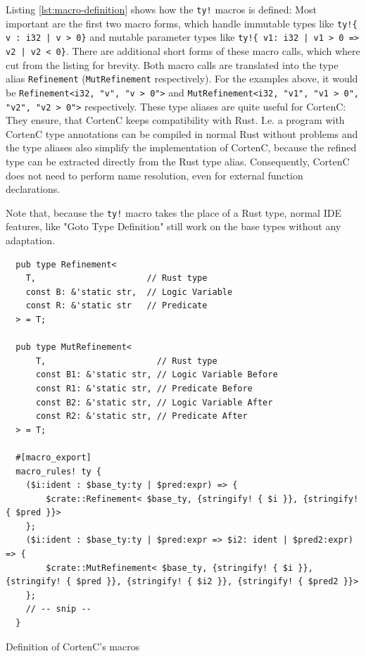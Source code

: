 \documentclass{book}
\newcommand{\code}[1]{\texttt{#1}}
\theoremstyle{definition}
\begin{document}
Listing \ref{lst:macro-definition} shows how the \code{ty!} macros is defined: Most important are the first two macro forms, which handle immutable types like \code{ty!\{ v : i32 | v > 0\}} and mutable parameter types like \code{ty!\{ v1: i32 | v1 > 0 => v2 | v2 < 0\}}. 
There are additional short forms of these macro calls, which where cut from the listing for brevity. Both macro calls are translated into the type alias \code{Refinement} (\code{MutRefinement} respectively). For the examples above, it would be \code{Refinement<i32, "v", "v > 0">} and \code{MutRefinement<i32, "v1", "v1 > 0", "v2", "v2 > 0">} respectively. These type aliases are quite useful for CortenC: They ensure, that CortenC keeps compatibility with Rust. I.e. a program with CortenC type annotations can be compiled in normal Rust without problems and the type aliases also simplify the implementation of CortenC, because the refined type can be extracted directly from the Rust type alias. Consequently, CortenC does not need to perform name resolution, even for external function declarations.

Note that, because the \code{ty!} macro takes the place of a Rust type, normal IDE features, like "Goto Type Definition" still work on the base types without any adaptation.

\begin{listing}[h]
  \begin{verbatim}
  pub type Refinement<
    T,                      // Rust type
    const B: &'static str,  // Logic Variable
    const R: &'static str   // Predicate
  > = T;

  pub type MutRefinement<
      T,                      // Rust type
      const B1: &'static str, // Logic Variable Before
      const R1: &'static str, // Predicate Before
      const B2: &'static str, // Logic Variable After
      const R2: &'static str, // Predicate After
  > = T;

  #[macro_export]
  macro_rules! ty {
    ($i:ident : $base_ty:ty | $pred:expr) => {
        $crate::Refinement< $base_ty, {stringify! { $i }}, {stringify! { $pred }}>
    };
    ($i:ident : $base_ty:ty | $pred:expr => $i2: ident | $pred2:expr) => {
        $crate::MutRefinement< $base_ty, {stringify! { $i }}, {stringify! { $pred }}, {stringify! { $i2 }}, {stringify! { $pred2 }}>
    };
    // -- snip --
  }
  \end{verbatim}
  \caption{Definition of CortenC's macros}
  \label{lst:macro-definition}
\end{listing}
\end{document}
